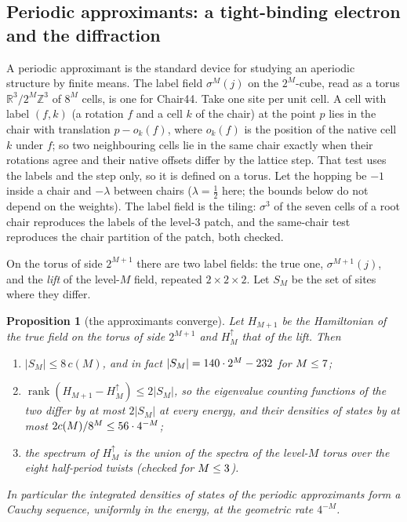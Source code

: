 \documentclass[11pt,a4paper]{article}
\newcommand{\ZZ}{\mathbb{Z}}
\newcommand{\RR}{\mathbb{R}}
\theoremstyle{plain}
\newtheorem{proposition}{Proposition}
\theoremstyle{definition}
\begin{document}
\subsection{Periodic approximants: a tight-binding electron and the diffraction}
\label{sec:chair-approx}

A periodic approximant is the standard device for studying an aperiodic structure by finite means.
The label field $\sigma^M(j)$ on the $2^M$-cube, read as a torus $\RR^3/2^M\ZZ^3$ of $8^M$ cells,
is one for Chair44. Take one site per unit cell. A cell with label $(f,k)$ (a rotation $f$
and a cell $k$ of the chair) at the point $p$ lies in the chair with translation $p-o_k(f)$, where
$o_k(f)$ is the position of the native cell $k$ under $f$; so two neighbouring cells lie in the same chair
exactly when their rotations agree and their native offsets differ by the lattice step. That test uses
the labels and the step only, so it is defined on a torus. Let the hopping be $-1$ inside a chair
and $-\lambda$ between chairs ($\lambda=\tfrac12$ here; the bounds below do not depend on the
weights). The label field is the tiling: $\sigma^3$ of the seven cells of a root chair reproduces
the labels of the level-$3$ patch, and the same-chair test reproduces the chair
partition of the patch, both checked.

On the torus of side $2^{M+1}$ there are two label fields: the true one, $\sigma^{M+1}(j)$, and the
\emph{lift} of the level-$M$ field, repeated $2\times2\times2$. Let $S_M$ be the set of sites where they differ.

\begin{proposition}[the approximants converge]
\label{prop:chair-approx}
Let $H_{M+1}$ be the Hamiltonian of the true field on the torus of side $2^{M+1}$ and $H_M^{\uparrow}$ that of the
lift. Then
\begin{enumerate}[label=(\alph*), nosep]
\item $\lvert S_M\rvert\le8\,c(M)$, and in fact $\lvert S_M\rvert=140\cdot2^M-232$ for $M\le7{}$;
\item $\operatorname{rank}(H_{M+1}-H_M^{\uparrow})\le2\lvert S_M\rvert$, so the eigenvalue counting functions of the two differ by at most
  $2\lvert S_M\rvert$ at every energy, and their densities of states by at most $2c(M)/8^M\le56\cdot4^{-M}$;
\item the spectrum of $H_M^{\uparrow}$ is the union of the spectra of the level-$M$ torus over the eight half-period twists
  (checked for $M\le3{}$).
\end{enumerate}
In particular the integrated densities of states of the periodic approximants form a Cauchy sequence, uniformly in the energy,
at the geometric rate $4^{-M}$.
\end{proposition}
\end{document}
